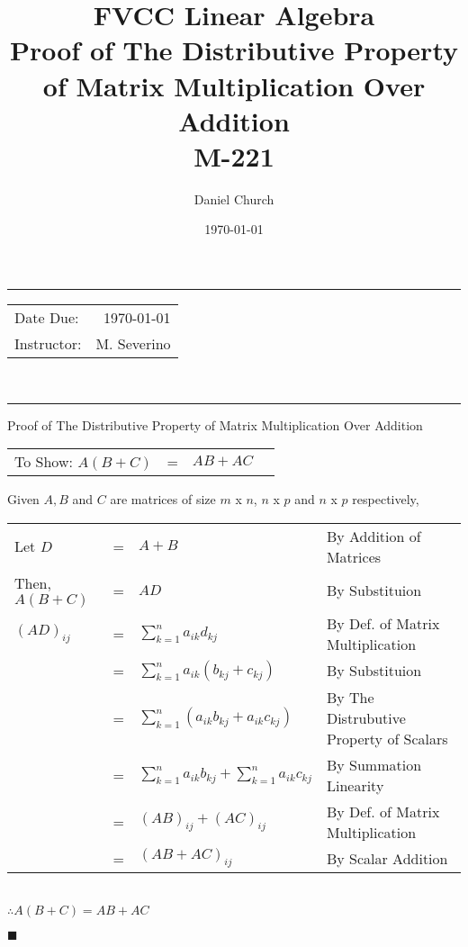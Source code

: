 \documentclass{article}
\title{FVCC Linear Algebra\\ Proof of The Distributive Property of Matrix Multiplication Over Addition  \\ M-221}
\author{Daniel Church}
\date{\today}
\begin{document}
\maketitle
\noindent
\rule[4mm]{17cm}{2pt}
\begin{tabular}{l r}
Date Due: & \today \\
Instructor: & M. Severino
\end{tabular}\\
\rule[4mm]{17cm}{2pt}

\newpage
{\centering
\LARGE Proof of The Distributive Property of Matrix Multiplication Over Addition \par
}
\begin{tabular}{@{}l l l @{\hskip 2.5in}l}
To Show: $A(B+C)$ & = & $AB + AC$ & 
\end{tabular}

Given $A, B$ and $C$ are matrices of size $m$ x $n$, $n$ x $p$ and $n$ x $p$ respectively,

\begin{tabular}{@{}l l l @{\hskip 0.5in}l}
Let $D$ & = & $A+B$ & By Addition of Matrices\\
Then, $A(B+C)$ & = & $AD$ & By Substituion\\
$(AD)_{ij}$ & = & $\displaystyle\sum_{k=1}^{n} a_{ik}d_{kj}$ & By Def. of Matrix Multiplication\\
 & = & $\displaystyle\sum_{k=1}^{n} a_{ik}(b_{kj}+c_{kj})$ & By Substituion\\
 & = & $\displaystyle\sum_{k=1}^{n} (a_{ik}b_{kj}+a_{ik}c_{kj})$ & By The Distrubutive Property of Scalars\\
& = & $\displaystyle\sum_{k=1}^{n} a_{ik}b_{kj} + \displaystyle\sum_{k=1}^{n} a_{ik}c_{kj}$ & By Summation Linearity\\
& = & $(AB)_{ij}+(AC)_{ij}$ & By Def. of Matrix Multiplication\\
& = & $(AB+AC)_{ij}$ & By Scalar Addition \\
\end{tabular}\\

$\therefore A(B+C) = AB + AC $
\begin{flushright}
$\blacksquare$
\end{flushright}
\end{document}
